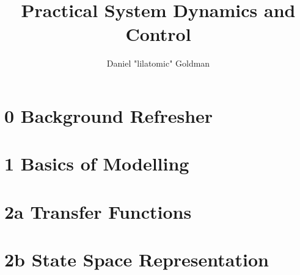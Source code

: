 \documentclass{templates/topic}
\title{Practical System Dynamics and Control}
\author{Daniel "lilatomic" Goldman}
\begin{document}
\maketitle

\part*{0 Background Refresher}


\part*{1 Basics of Modelling}





\part*{2a Transfer Functions}







\part*{2b State Space Representation}





\end{document}
